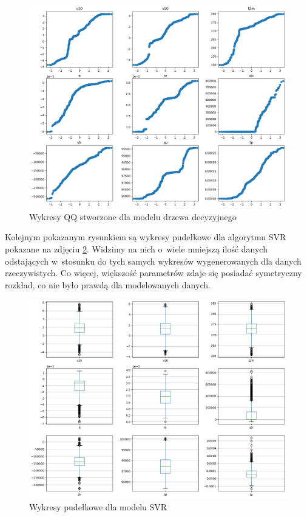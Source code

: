 \begin{figure}[H]
    \centering
    \includegraphics[width=\textwidth]{images/dt_qq.png}
    \caption{Wykresy QQ stworzone dla modelu drzewa decyzyjnego}
    \label{dt-qq}
\end{figure}

Kolejnym pokazanym rysunkiem są wykresy pudełkowe dla algorytmu SVR pokazane na zdjęciu \ref{svr-box}. 
Widzimy na nich o~wiele mniejszą ilość
danych odstających w~stosunku do tych samych wykresów wygenerowanych dla danych rzeczywistych. Co więcej,
większość parametrów zdaje się posiadać symetryczny rozkład, co nie było prawdą dla modelowanych danych.

\begin{figure}[H]
    \centering
    \includegraphics[width=.8\textwidth]{images/svr_box.png}
    \caption{Wykresy pudełkowe dla modelu SVR}
    \label{svr-box}
\end{figure}

